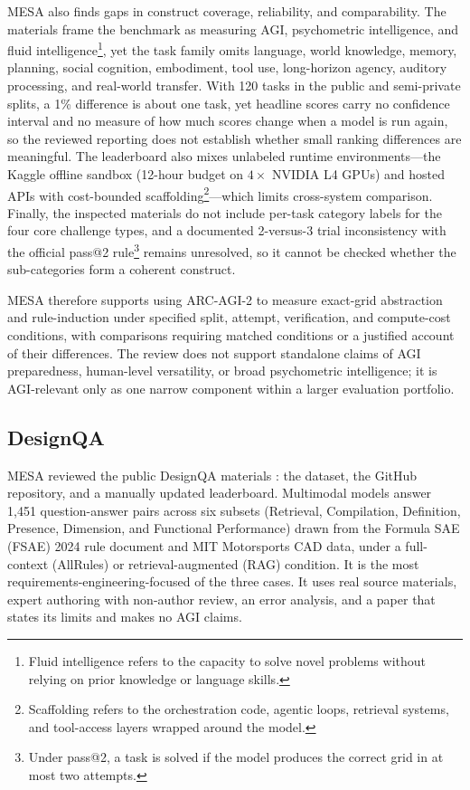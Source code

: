 \documentclass[conference]{IEEEtran}
\begin{document}
        MESA also finds gaps in construct coverage, reliability, and comparability. The materials frame the benchmark as measuring AGI, psychometric intelligence, and fluid intelligence\footnote{Fluid intelligence refers to the capacity to solve novel problems without relying on prior knowledge or language skills.}, yet the task family omits language, world knowledge, memory, planning, social cognition, embodiment, tool use, long-horizon agency, auditory processing, and real-world transfer. With 120 tasks in the public and semi-private splits, a 1\% difference is about one task, yet headline scores carry no confidence interval and no measure of how much scores change when a model is run again, so the reviewed reporting does not establish whether small ranking differences are meaningful. The leaderboard also mixes unlabeled runtime environments---the Kaggle offline sandbox (12-hour budget on $4\times$ NVIDIA L4 GPUs) and hosted APIs with cost-bounded scaffolding\footnote{Scaffolding refers to the orchestration code, agentic loops, retrieval systems, and tool-access layers wrapped around the model.}---which limits cross-system comparison. Finally, the inspected materials do not include per-task category labels for the four core challenge types, and a documented 2-versus-3 trial inconsistency with the official pass@2 rule\footnote{Under pass@2, a task is solved if the model produces the correct grid in at most two attempts.} remains unresolved, so it cannot be checked whether the sub-categories form a coherent construct.
        
        MESA therefore supports using ARC-AGI-2 to measure exact-grid abstraction and rule-induction under specified split, attempt, verification, and compute-cost conditions, with comparisons requiring matched conditions or a justified account of their differences. The review does not support standalone claims of AGI preparedness, human-level versatility, or broad psychometric intelligence; it is AGI-relevant only as one narrow component within a larger evaluation portfolio.
        
    \subsection{DesignQA}

        MESA reviewed the public DesignQA materials \cite{doris_designqa_2024}: the dataset, the GitHub repository, and a manually updated leaderboard. Multimodal models answer 1,451 question-answer pairs across six subsets (Retrieval, Compilation, Definition, Presence, Dimension, and Functional Performance) drawn from the Formula SAE (FSAE) 2024 rule document and MIT Motorsports CAD data, under a full-context (AllRules) or retrieval-augmented (RAG) condition. It is the most requirements-engineering-focused of the three cases. It uses real source materials, expert authoring with non-author review, an error analysis, and a paper that states its limits and makes no AGI claims.
\end{document}
